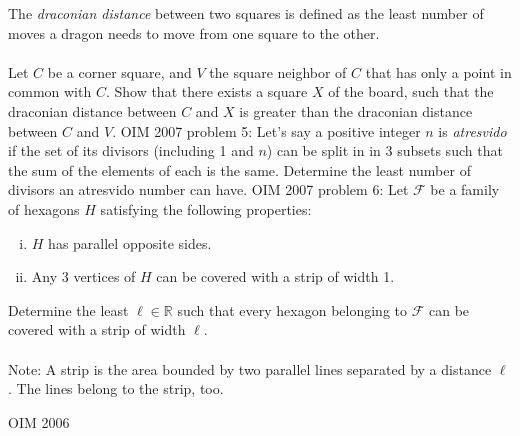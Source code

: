 The \textit{draconian distance} between two squares is defined as the least number of moves a dragon needs to move from one square to the other. \\\\
Let $ C$ be a corner square, and $ V$ the square neighbor of $ C$ that has only a point in common with $ C$. Show that there exists a square $ X$ of the board, such that the draconian distance between $ C$ and $ X$ is greater than the draconian distance between $ C$ and $ V$. 
OIM 2007 problem 5:  Let's say a positive integer $ n$ is \textit{atresvido} if the set of its divisors (including 1 and $ n$) can be split in in 3 subsets such that the sum of the elements of each is the same. Determine the least number of divisors an atresvido number can have. 
OIM 2007 problem 6:  Let $ \mathcal{F}$ be a family of hexagons $ H$ satisfying the following properties:
\begin{enumerate}[i)]
  \item $ H$ has parallel opposite sides.
  \item Any 3 vertices of $ H$ can be covered with a strip of width 1.
\end{enumerate}
Determine the least $ \ell\in\mathbb{R}$ such that every hexagon belonging to $ \mathcal{F}$ can be covered with a strip of width $ \ell$. \\\\
Note: A strip is the area bounded by two parallel lines separated by a distance $ \ell$. The lines belong to the strip, too. 

OIM 2006 

